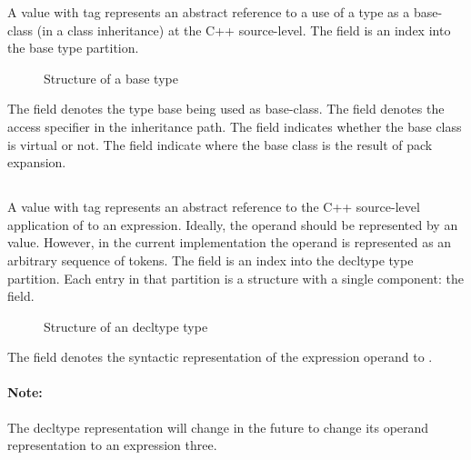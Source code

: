A  value with tag  represents an
abstract reference to a use of a type as a base-class (in a class inheritance)
at the C++ source-level.
The  field is an index into the base type partition.
%
\begin{figure}[H]
	\centering
	\caption{Structure of a base type}
	\label{fig:ifc-base-type-structure}
\end{figure}
%
The  field denotes the type base being used as base-class.
The  field denotes the access specifier in the inheritance path.
The  field indicates whether the base class is virtual or not.
The  field indicate where the base class is the result of pack expansion.




\subsection{}
\label{sec:ifc:TypeSort:Decltype}

A  value with tag  represents
an abstract reference to the C++ source-level application of  to
an expression. Ideally, the operand should be represented by an 
value.  However, in the current implementation the operand is represented
as an arbitrary sequence of tokens.
The  field is an index into the decltype type partition.
Each entry in that partition is a structure with a single component: the  field.
%
\begin{figure}[H]
	\centering
	\caption{Structure of an decltype type}
	\label{fig:ifc-decltype-type-structure}
\end{figure}
%
The  field denotes the syntactic representation of the expression operand to .


\paragraph{Note:} The decltype representation will change in the future to change its operand representation to an expression three.

